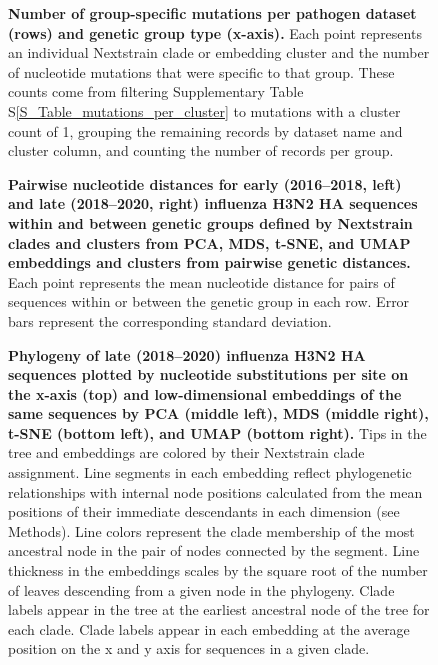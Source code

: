 \documentclass[webpdf,contemporary,large,single]{oup-authoring-template}%
\theoremstyle{thmstyleone}%
\theoremstyle{thmstyletwo}%
\theoremstyle{thmstylethree}%
\begin{document}
\begin{figure}[H]
\caption{{\bf Number of group-specific mutations per pathogen dataset (rows) and genetic group type (x-axis).}
  Each point represents an individual Nextstrain clade or embedding cluster and the number of nucleotide mutations that were specific to that group.
  These counts come from filtering Supplementary Table S\ref{S_Table_mutations_per_cluster} to mutations with a cluster count of 1, grouping the remaining records by dataset name and cluster column, and counting the number of records per group.
}\label{S_Fig_group_specific_mutations}
\end{figure}

\begin{figure}[H]
\caption{{\bf Pairwise nucleotide distances for early (2016--2018, left) and late (2018--2020, right) influenza H3N2 HA sequences within and between genetic groups defined by Nextstrain clades and clusters from PCA, MDS, t-SNE, and UMAP embeddings and clusters from pairwise genetic distances.}
  Each point represents the mean nucleotide distance for pairs of sequences within or between the genetic group in each row.
  Error bars represent the corresponding standard deviation.}\label{S_Fig_flu_within_between_group_distances}
\end{figure}

\begin{figure}[H]
\caption{{\bf Phylogeny of late (2018--2020) influenza H3N2 HA sequences plotted by nucleotide substitutions per site on the x-axis (top) and low-dimensional embeddings of the same sequences by PCA (middle left), MDS (middle right), t-SNE (bottom left), and UMAP (bottom right).}
Tips in the tree and embeddings are colored by their Nextstrain clade assignment.
Line segments in each embedding reflect phylogenetic relationships with internal node positions calculated from the mean positions of their immediate descendants in each dimension (see Methods).
Line colors represent the clade membership of the most ancestral node in the pair of nodes connected by the segment.
Line thickness in the embeddings scales by the square root of the number of leaves descending from a given node in the phylogeny.
Clade labels appear in the tree at the earliest ancestral node of the tree for each clade.
Clade labels appear in each embedding at the average position on the x and y axis for sequences in a given clade.}\label{S_Fig_late_flu_embeddings_by_clade}
\end{figure}
\end{document}
